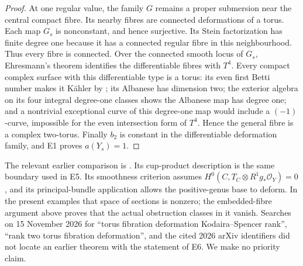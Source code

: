 \begin{proof}
At one regular value, the family $G$ remains a proper submersion
near the central compact fibre. Its nearby fibres are connected
deformations of a torus. Each map $G_s$ is nonconstant, and hence
surjective. Its Stein factorization has finite degree one because
it has a connected regular fibre in this neighbourhood. Thus
every fibre is connected. Over the connected smooth locus of
$G_s$, Ehresmann's theorem identifies the differentiable fibres
with $T^4$. Every compact complex surface with this differentiable
type is a torus: its even first Betti number makes it K\"ahler
by \cite[Theorem 11]{Buchdahl1999};
its Albanese has dimension two; the exterior algebra on its four
integral degree-one classes shows the Albanese map has degree one;
and a nontrivial exceptional curve of this degree-one map would
include a $(-1)$-curve, impossible for the even intersection form
of $T^4$. Hence the general fibre is a complex two-torus.
Finally $b_2$ is constant in the differentiable deformation family,
and E1 proves $a(Y_s)=1$.
\end{proof}

The relevant earlier comparison is \cite[Remark 4.1, Proposition 4.2,
Theorem 4.4]{Catanese2004}. Its cup-product description is the same
boundary used in E5. Its smoothness criterion assumes
$H^0(C,T_C\otimes R^1g_*\mathcal O_Y)=0$, and its principal-bundle
application allows the positive-genus base to deform. In the present
examples that space of sections is nonzero; the embedded-fibre
argument above proves that the actual obstruction classes in it
vanish. Searches on 15 November 2026 for ``torus fibration deformation
Kodaira--Spencer rank'', ``rank two torus fibration deformation'',
and the cited 2026 arXiv identifiers did not locate an earlier theorem
with the statement of E6. We make no priority claim.



